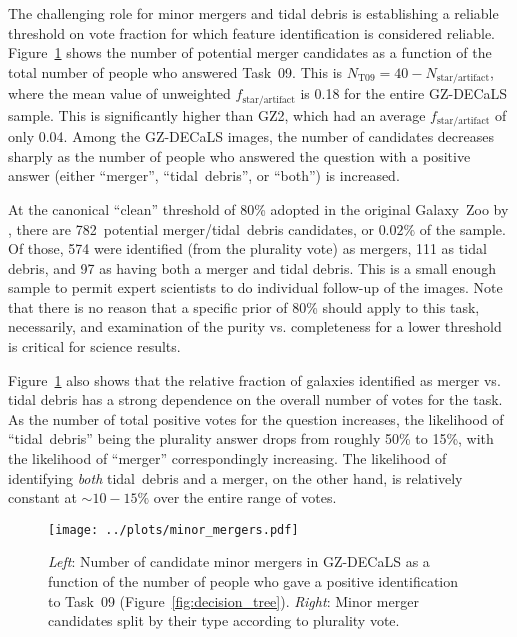 \documentclass[iop,apj,tighten]{emulateapj}
\begin{document}
\begin{enumerate}
The challenging role for minor mergers and tidal debris is establishing a reliable threshold on vote fraction for which feature identification is considered reliable. Figure~\ref{fig:minor_mergers} shows the number of potential merger candidates as a function of the total number of people who answered Task~09. This is $N_\textrm{T09} = 40 - N_\textrm{star/artifact}$, where the mean value of unweighted $f_\textrm{star/artifact}$ is 0.18 for the entire GZ-DECaLS sample. This is significantly higher than GZ2, which had an average $f_\textrm{star/artifact}$ of only 0.04. Among the GZ-DECaLS images, the number of candidates decreases sharply as the number of people who answered the question with a positive answer (either ``merger'', ``tidal~debris'', or ``both'') is increased. 

At the canonical ``clean'' threshold of 80\% adopted in the original Galaxy~Zoo by \citet{lin08}, there are 782~potential merger/tidal~debris candidates, or $0.02\%$ of the sample. Of those, 574 were identified (from the plurality vote) as mergers, 111 as tidal debris, and 97 as having both a merger and tidal debris. This is a small enough sample to permit expert scientists to do individual follow-up of the images. Note that there is no reason that a specific prior of 80\% should apply to this task, necessarily, and examination of the purity vs. completeness for a lower threshold is critical for science results. 

Figure~\ref{fig:minor_mergers} also shows that the relative fraction of galaxies identified as merger vs. tidal debris has a strong dependence on the overall number of votes for the task. As the number of total positive votes for the question increases, the likelihood of ``tidal~debris'' being the plurality answer drops from roughly 50\% to 15\%, with the likelihood of ``merger'' correspondingly increasing. The likelihood of identifying \emph{both} tidal~debris and a merger, on the other hand, is relatively constant at $\sim10-15\%$ over the entire range of votes.

\begin{figure}
\centering
\texttt{[image: ../plots/minor\_mergers.pdf]}
\caption{\textit{Left}: Number of candidate minor mergers in GZ-DECaLS as a function of the number of people who gave a positive identification to Task~09 (Figure~\ref{fig:decision_tree}). \textit{Right}: Minor merger candidates split by their type according to plurality vote.\label{fig:minor_mergers}}
\end{figure}

\end{enumerate}
\end{document}
